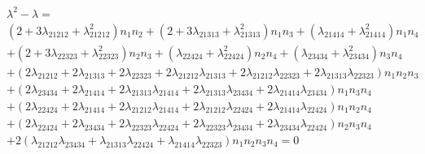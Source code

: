 \documentclass[12pt]{article}
\begin{document}
\bigskip 
\begin{eqnarray*}
&&\lambda ^{2}-\lambda = \\
&&\left( 2+3\lambda _{21212}+\lambda _{21212}^{2}\right) n_{1}n_{2}+\left(
2+3\lambda _{21313}+\lambda _{21313}^{2}\right) n_{1}n_{3}+\left( \lambda
_{21414}+\lambda _{21414}^{2}\right) n_{1}n_{4} \\
&&+\left( 2+3\lambda _{22323}+\lambda _{22323}^{2}\right) n_{2}n_{3}+\left(
\lambda _{22424}+\lambda _{22424}^{2}\right) n_{2}n_{4}+\left( \lambda
_{23434}+\lambda _{23434}^{2}\right) n_{3}n_{4} \\
&&+\left( 2\lambda _{21212}+2\lambda _{21313}+2\lambda _{22323}+2\lambda
_{21212}\lambda _{21313}+2\lambda _{21212}\lambda _{22323}+2\lambda
_{21313}\lambda _{22323}\right) n_{1}n_{2}n_{3} \\
&&+\left( 2\lambda _{23434}+2\lambda _{21414}+2\lambda _{21313}\lambda
_{21414}+2\lambda _{21313}\lambda _{23434}+2\lambda _{21414}\lambda
_{23434}\right) n_{1}n_{3}n_{4} \\
&&+\left( 2\lambda _{22424}+2\lambda _{21414}+2\lambda _{21212}\lambda
_{21414}+2\lambda _{21212}\lambda _{22424}+2\lambda _{21414}\lambda
_{22424}\right) n_{1}n_{2}n_{4} \\
&&+\left( 2\lambda _{22424}+2\lambda _{23434}+2\lambda _{22323}\lambda
_{22424}+2\lambda _{22323}\lambda _{23434}+2\lambda _{23434}\lambda
_{22424}\right) n_{2}n_{3}n_{4} \\
&&+2\left( \lambda _{21212}\lambda _{23434}+\lambda _{21313}\lambda
_{22424}+\lambda _{21414}\lambda _{22323}\right) n_{1}n_{2}n_{3}n_{4}=0
\end{eqnarray*}

\bigskip
\end{document}
